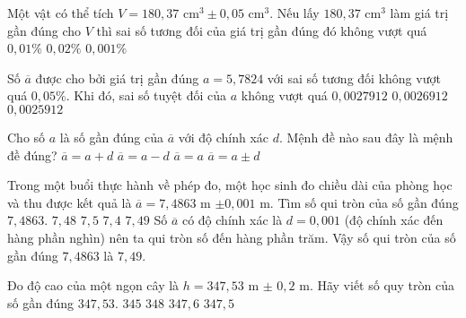 \begin{ex}%
	Một vật có thể tích $V = 180{,}37 \text{\ cm}^3 \pm 0,05 \text{\ cm}^3$. Nếu lấy $180{,}37 \text{\ cm}^3$ làm giá trị gần đúng cho $V$ thì sai số tương đối của giá trị gần đúng đó không vượt quá 
	{$0{,}01 \%$}
	{$0{,}02 \%$}
	{$0{,}001 \%$}
\end{ex}

\begin{ex}%
	Số $\overline{a}$ được cho bởi giá trị gần đúng $a = 5{,}7824$ với sai số tương đối không vượt quá $0{,}05\%$. Khi đó, sai số tuyệt đối của $a$ không vượt quá
	{$0{,}0027912$}
	{$0{,}0026912$}
	{$0{,}0025912$}
\end{ex}

\begin{ex}%
	Cho số $a$ là số gần đúng của $\overline{a}$ với độ chính xác $d$. Mệnh đề nào sau đây là mệnh đề đúng?
	\choice
	{$\overline{a}=a+d$}
	{$\overline{a}=a-d$}
	{$\overline{a}=a$}	
	{\True $\overline{a}=a\pm d$}
\end{ex}

\begin{ex}%
Trong một buổi thực hành về phép đo, một học sinh đo chiều dài của phòng học và thu được kết quả là $\overline{a}=7{,}4863$ m $\pm 0{,}001$ m. Tìm số qui tròn của số gần đúng $7{,}4863$.
\choice
{$7{,}48$}
{$7{,}5$}
{$7{,}4$}
{\True $7{,}49$}
\loigiai
{
Số $\overline{a}$ có độ chính xác là $d=0{,}001$ (độ chính xác đến hàng phần nghìn) nên ta qui tròn số đến hàng phần trăm.
Vậy số qui tròn của số gần đúng $7{,}4863$ là $7{,}49$.
}
\end{ex}


\begin{ex}%
	Đo độ cao của một ngọn cây là $h=347{,}53$ m $\pm$ $0{,}2$ m. Hãy viết số quy tròn của số gần đúng $347{,}53$.
	\choice
	{$345$}
	{\True $348$}
	{$347{,}6$}
	{$347{,}5$}
\end{ex}

